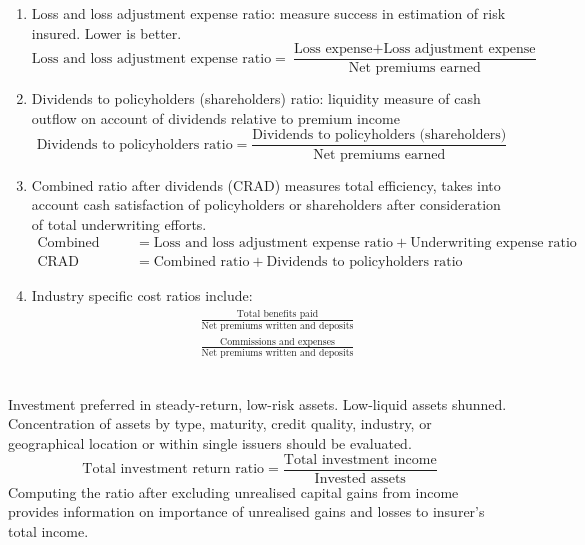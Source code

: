 \begin{remark} 
\begin{enumerate}[label=\roman*.]
\setlength{\itemsep}{0pt}
\item Loss and loss adjustment expense ratio: measure success in estimation of risk insured. Lower is better.
\begin{equation}
\text{Loss and loss adjustment expense ratio} = \frac{\text{Loss expense} + \text{Loss adjustment expense}}{\text{Net premiums earned}} \nonumber
\end{equation}
\item Dividends to policyholders (shareholders) ratio: liquidity measure of cash outflow on account of dividends relative to premium income
\begin{equation}
\text{Dividends to policyholders ratio} = \frac{\text{Dividends to policyholders (shareholders)}}{\text{Net premiums earned}} \nonumber
\end{equation}
\item Combined ratio after dividends (CRAD) measures total efficiency, takes into account cash satisfaction of policyholders or shareholders after consideration of total underwriting efforts.
\begin{align}
\text{Combined ratio} &= \text{Loss and loss adjustment expense ratio} + \text{Underwriting expense ratio} \nonumber \\
\text{CRAD} &= \text{Combined ratio} + \text{Dividends to policyholders ratio} \nonumber
\end{align}
\item Industry specific cost ratios include:
\begin{align}
&\frac{\text{Total benefits paid}}{\text{Net premiums written and deposits}} \nonumber \\
&\frac{\text{Commissions and expenses}}{\text{Net premiums written and deposits}} \nonumber
\end{align}
\end{enumerate}
\end{remark}

\begin{remark} \\
Investment preferred in steady-return, low-risk assets. Low-liquid assets shunned.\\
Concentration of assets by type, maturity, credit quality, industry, or geographical location or within single issuers should be evaluated.
\begin{equation}
\text{Total investment return ratio} = \frac{\text{Total investment income}}{\text{Invested assets}} \nonumber
\end{equation}
Computing the ratio after excluding unrealised capital gains from income provides information on importance of unrealised gains and losses to insurer's total income.
\end{remark}

